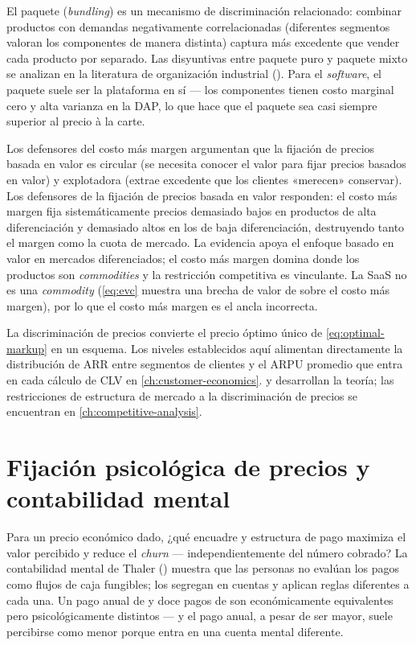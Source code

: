 El paquete (\emph{bundling}) es un mecanismo de discriminación relacionado: combinar productos con demandas negativamente correlacionadas (diferentes segmentos valoran los componentes de manera distinta) captura más excedente que vender cada producto por separado. Las disyuntivas entre paquete puro y paquete mixto se analizan en la literatura de organización industrial (\textcite{pindyck2017}). Para el \emph{software}, el paquete suele ser la plataforma en sí --- los componentes tienen costo marginal cero y alta varianza en la DAP, lo que hace que el paquete sea casi siempre superior al precio à la carte.

Los defensores del costo más margen argumentan que la fijación de precios basada en valor es circular (se necesita conocer el valor para fijar precios basados en valor) y explotadora (extrae excedente que los clientes «merecen» conservar). Los defensores de la fijación de precios basada en valor responden: el costo más margen fija sistemáticamente precios demasiado bajos en productos de alta diferenciación y demasiado altos en los de baja diferenciación, destruyendo tanto el margen como la cuota de mercado. La evidencia apoya el enfoque basado en valor en mercados diferenciados; el costo más margen domina donde los productos son \emph{commodities} y la restricción competitiva es vinculante. La SaaS no es una \emph{commodity} (\cref{eq:evc} muestra una brecha de valor de  sobre el costo más margen), por lo que el costo más margen es el ancla incorrecta.

La discriminación de precios convierte el precio óptimo único de \cref{eq:optimal-markup} en un esquema. Los niveles establecidos aquí alimentan directamente la distribución de ARR entre segmentos de clientes y el ARPU promedio que entra en cada cálculo de CLV en \cref{ch:customer-economics}. \textcite{nagle2023strategy} y \textcite{pindyck2017} desarrollan la teoría; las restricciones de estructura de mercado a la discriminación de precios se encuentran en \cref{ch:competitive-analysis}.

\section{Fijación psicológica de precios y contabilidad mental}\label{sec:psych-pricing}

Para un precio económico dado, ¿qué encuadre y estructura de pago maximiza el valor percibido y reduce el \emph{churn} --- independientemente del número cobrado? La contabilidad mental de Thaler (\textcite{thaler1985mental}) muestra que las personas no evalúan los pagos como flujos de caja fungibles; los segregan en cuentas y aplican reglas diferentes a cada una. Un pago anual de  y doce pagos de  son económicamente equivalentes pero psicológicamente distintos --- y el pago anual, a pesar de ser mayor, suele percibirse como menor porque entra en una cuenta mental diferente.

